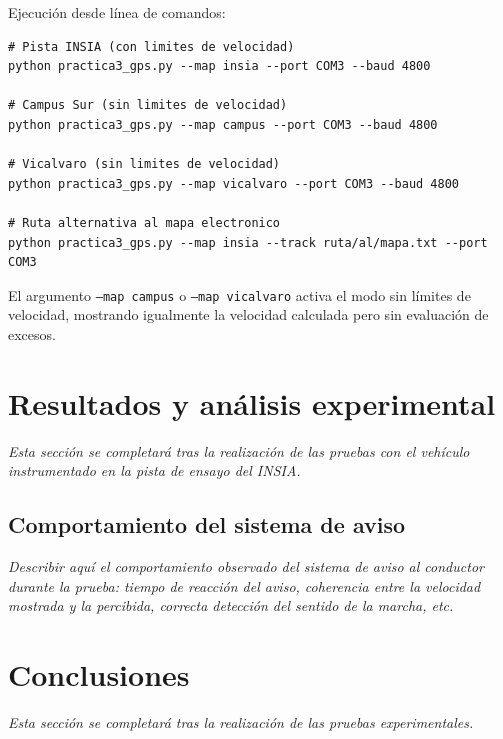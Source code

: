 \documentclass[10pt]{article}
\begin{document}
Ejecución desde línea de comandos:
\begin{lstlisting}[style=pythonEstilo]
# Pista INSIA (con limites de velocidad)
python practica3_gps.py --map insia --port COM3 --baud 4800

# Campus Sur (sin limites de velocidad)
python practica3_gps.py --map campus --port COM3 --baud 4800

# Vicalvaro (sin limites de velocidad)
python practica3_gps.py --map vicalvaro --port COM3 --baud 4800

# Ruta alternativa al mapa electronico
python practica3_gps.py --map insia --track ruta/al/mapa.txt --port COM3
\end{lstlisting}

El argumento \texttt{--map campus} o \texttt{--map vicalvaro} activa el modo sin límites de velocidad, mostrando igualmente la velocidad calculada pero sin evaluación de excesos.

\section{Resultados y análisis experimental}

\textit{Esta sección se completará tras la realización de las pruebas con el vehículo instrumentado en la pista de ensayo del INSIA.}


\subsection{Comportamiento del sistema de aviso}

\textit{Describir aquí el comportamiento observado del sistema de aviso al conductor durante la prueba: tiempo de reacción del aviso, coherencia entre la velocidad mostrada y la percibida, correcta detección del sentido de la marcha, etc.}


\section{Conclusiones}

\textit{Esta sección se completará tras la realización de las pruebas experimentales.}

\vspace{1em}
\end{document}
